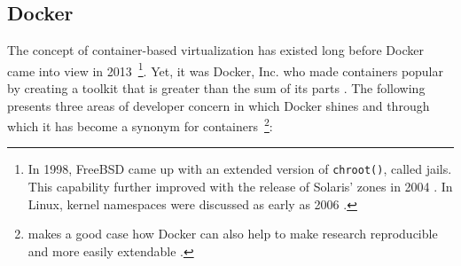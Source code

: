 \subsection{Docker}
\label{sec:docker}

The concept of container-based virtualization has existed long before Docker came into view in 2013~\footnote{In 1998, FreeBSD came up with an extended version of \texttt{chroot()}, called jails. This capability further improved with the release of Solaris' zones in 2004 \cite[p.~82]{bernstein2014containers}. In Linux, kernel namespaces were discussed as early as 2006 \cite[p.~1]{celesti2016exploring}.}. Yet, it was Docker, Inc. who made containers popular by creating a toolkit that is greater than the sum of its parts \cite[p.~1]{merkel2014docker}. The following presents three areas of developer concern in which Docker shines and through which it has become a synonym for containers~\footnote{\citeauthor{boettiger2015introduction} makes a good case how Docker can also help to make research reproducible and more easily extendable \cite[p.~71]{boettiger2015introduction}.}:

